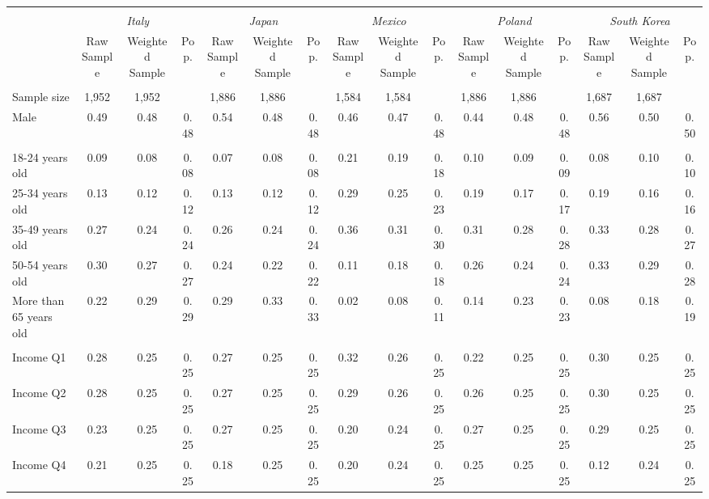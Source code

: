 \begin{tabular}{l*{15}{c}}
\toprule
\hline \\[-1.8ex]
\multicolumn{1}{c}{\em{ }} & \multicolumn{3}{c}{\em{Italy}} & \multicolumn{3}{c}{\em{Japan}} & \multicolumn{3}{c}{\em{Mexico}} & \multicolumn{3}{c}{\em{Poland}} & \multicolumn{3}{c}{\em{South Korea}} \\
\cmidrule(l{3pt}r{3pt}){2-4} \cmidrule(l{3pt}r{3pt}){5-7} \cmidrule(l{3pt}r{3pt}){8-10} \cmidrule(l{3pt}r{3pt}){11-13} \cmidrule(l{3pt}r{3pt}){14-16}
\noalign{\smallskip}  & Raw Sample & Weighted Sample & Pop. & Raw Sample & Weighted Sample & Pop. & Raw Sample & Weighted Sample & Pop. & Raw Sample & Weighted Sample & Pop. & Raw Sample & Weighted Sample & Pop. \\
\hline \\[-1.8ex] 
Sample size & 1,952 & 1,952 & & 1,886 & 1,886 & & 1,584 & 1,584 & & 1,886 & 1,886 & & 1,687 & 1,687 & \\
\noalign{\smallskip}\hline \noalign{\smallskip}Male & 0.49 & 0.48 & 0.48 & 0.54 & 0.48 & 0.48 & 0.46 & 0.47 & 0.48 & 0.44 & 0.48 & 0.48 & 0.56 & 0.50 & 0.50 \\ 
\\
18-24 years old & 0.09 & 0.08 & 0.08 & 0.07 & 0.08 & 0.08 & 0.21 & 0.19 & 0.18 & 0.10 & 0.09 & 0.09 & 0.08 & 0.10 & 0.10 \\
25-34 years old & 0.13 & 0.12 & 0.12 & 0.13 & 0.12 & 0.12 & 0.29 & 0.25 & 0.23 & 0.19 & 0.17 & 0.17 & 0.19 & 0.16 & 0.16 \\
35-49 years old & 0.27 & 0.24 & 0.24 & 0.26 & 0.24 & 0.24 & 0.36 & 0.31 & 0.30 & 0.31 & 0.28 & 0.28 & 0.33 & 0.28 & 0.27 \\
50-54 years old & 0.30 & 0.27 & 0.27 & 0.24 & 0.22 & 0.22 & 0.11 & 0.18 & 0.18 & 0.26 & 0.24 & 0.24 & 0.33 & 0.29 & 0.28 \\
More than 65 years old & 0.22 & 0.29 & 0.29 & 0.29 & 0.33 & 0.33 & 0.02 & 0.08 & 0.11 & 0.14 & 0.23 & 0.23 & 0.08 & 0.18 & 0.19 \\ 
\\
Income Q1 & 0.28 & 0.25 & 0.25 & 0.27 & 0.25 & 0.25 & 0.32 & 0.26 & 0.25 & 0.22 & 0.25 & 0.25 & 0.30 & 0.25 & 0.25 \\
Income Q2 & 0.28 & 0.25 & 0.25 & 0.27 & 0.25 & 0.25 & 0.29 & 0.26 & 0.25 & 0.26 & 0.25 & 0.25 & 0.30 & 0.25 & 0.25 \\
Income Q3 & 0.23 & 0.25 & 0.25 & 0.27 & 0.25 & 0.25 & 0.20 & 0.24 & 0.25 & 0.27 & 0.25 & 0.25 & 0.29 & 0.25 & 0.25 \\
Income Q4 & 0.21 & 0.25 & 0.25 & 0.18 & 0.25 & 0.25 & 0.20 & 0.24 & 0.25 & 0.25 & 0.25 & 0.25 & 0.12 & 0.24 & 0.25 \\

\end{tabular}
